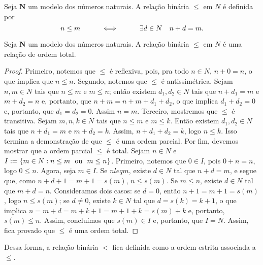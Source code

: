 \begin{defi}
	Seja $\bm N$ um modelo dos números naturais. A relação binária $\leq$ em $N$ é definida por
	\begin{equation*}
	n \leq m \qquad \quad \Longleftrightarrow \quad \qquad \exists d \in N \quad n+d=m.
	\end{equation*}
\end{defi}

\begin{prop}
	Seja $\bm N$ um modelo dos números naturais. A relação binária $\leq$ em $N$ é uma relação de ordem total.
\end{prop}
\begin{proof}
	Primeiro, notemos que $\leq$ é reflexiva, pois, pra todo $n \in N$, $n+0=n$, o que implica que $n \leq n$. Segundo, notemos que $\leq$ é antissimétrica. Sejam $n,m \in N$ tais que $n \leq m$ e $m \leq n$; então existem $d_1,d_2 \in N$ tais que $n+d_1=m$ e $m+d_2=n$ e, portanto, que $n+m=n+m+d_1+d_2$, o que implica $d_1+d_2=0$ e, portanto, que $d_1=d_2=0$. Assim $n=m$. Terceiro, mostremos que $\leq$ é transitiva. Sejam $m,n,k \in N$ tais que $n \leq m$ e $m \leq k$. Então existem $d_1,d_2 \in N$ tais que $n+d_1=m$ e $m+d_2=k$. Assim, $n+d_1+d_2=k$, logo $n \leq k$. Isso termina a demonstração de que $\leq$ é uma ordem parcial. Por fim, devemos mostrar que a ordem parcial $\leq$ é total. Sejam $n \in N$ e $I := \{m \in N: n \leq m \text{\ \ ou\ \ } m \leq n\}$. Primeiro, notemos que $0 \in I$, pois $0+n=n$, logo $0 \leq n$. Agora, seja $m \in I$. Se $n leq m$, existe $d \in N$ tal que $n+d=m$, e segue que, como $n+d+1=m+1=s(m)$, $n \leq s(m)$. Se $m \leq n$, existe $d \in N$ tal que $m+d=n$. Consideramos dois casos: se $d=0$, então $n+1=m+1=s(m)$, logo $n \leq s(m)$; se $d \neq 0$, existe $k \in N$ tal que $d=s(k)=k+1$, o que implica $n=m+d=m+k+1=m+1+k=s(m)+k$ e, portanto, $s(m) \leq n$. Assim, concluímos que $s(m) \in I$ e, portanto, que $I=N$. Assim, fica provado que $\leq$ é uma ordem total.
\end{proof}

	Dessa forma, a relação binária $<$ fica definida como a ordem estrita associada a $\leq$.

